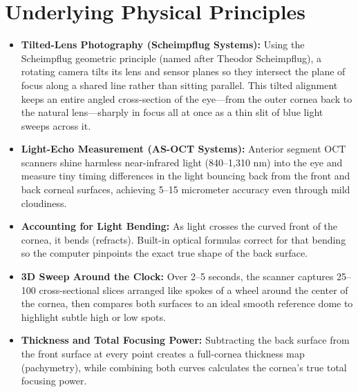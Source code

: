 \section{Underlying Physical Principles}
\begin{itemize}
    \item \textbf{Tilted-Lens Photography (Scheimpflug Systems):} Using the Scheimpflug geometric principle (named after Theodor Scheimpflug), a rotating camera tilts its lens and sensor planes so they intersect the plane of focus along a shared line rather than sitting parallel. This tilted alignment keeps an entire angled cross-section of the eye---from the outer cornea back to the natural lens---sharply in focus all at once as a thin slit of blue light sweeps across it.
    \item \textbf{Light-Echo Measurement (AS-OCT Systems):} Anterior segment OCT scanners shine harmless near-infrared light (840--1,310 nm) into the eye and measure tiny timing differences in the light bouncing back from the front and back corneal surfaces, achieving 5--15 micrometer accuracy even through mild cloudiness.
    \item \textbf{Accounting for Light Bending:} As light crosses the curved front of the cornea, it bends (refracts). Built-in optical formulas correct for that bending so the computer pinpoints the exact true shape of the back surface.
    \item \textbf{3D Sweep Around the Clock:} Over 2--5 seconds, the scanner captures 25--100 cross-sectional slices arranged like spokes of a wheel around the center of the cornea, then compares both surfaces to an ideal smooth reference dome to highlight subtle high or low spots.
    \item \textbf{Thickness and Total Focusing Power:} Subtracting the back surface from the front surface at every point creates a full-cornea thickness map (pachymetry), while combining both curves calculates the cornea's true total focusing power.
\end{itemize}


